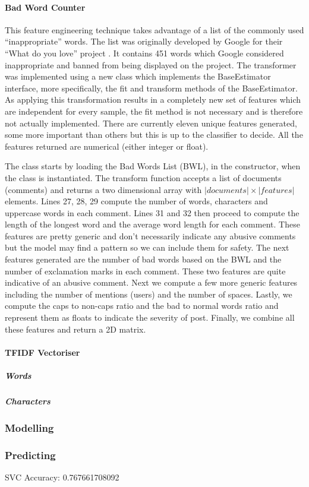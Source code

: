 \paragraph{Bad Word Counter} This feature engineering technique takes advantage of a list of the commonly used ``inappropriate'' words. The list was originally developed by Google for their ``What do you love'' project \cite{GitHub:GoogleBadWordList}. It contains 451 words which Google considered inappropriate and banned from being displayed on the project. The transformer was implemented using a new class which implements the BaseEstimator interface, more specifically, the fit and transform methods of the BaseEstimator. As applying this transformation results in a completely new set of features which are independent for every sample, the fit method is not necessary and is therefore not actually implemented. There are currently eleven unique features generated, some more important than others but this is up to the classifier to decide. All the features returned are numerical (either integer or float).

The class starts by loading the Bad Words List (BWL), in the constructor, when the class is instantiated. The transform function accepts a list of documents (comments) and returns a two dimensional array with $|documents| \times |features|$ elements. Lines 27, 28, 29 compute the number of words, characters and uppercase words in each comment. Lines 31 and 32 then proceed to compute the length of the longest word and the average word length for each comment. These features are pretty generic and don't necessarily indicate any abusive comments but the model may find a pattern so we can include them for safety. The next features generated are the number of bad words based on the BWL and the number of exclamation marks in each comment. These two features are quite indicative of an abusive comment. Next we compute a few more generic features including the number of mentions (users) and the number of spaces. Lastly, we compute the caps to non-caps ratio and the bad to normal words ratio and represent them as floats to indicate the severity of post. Finally, we combine all these features and return a 2D matrix.

\paragraph{TFIDF Vectoriser}

\subparagraph{Words}
\subparagraph{Characters}

\subsubsection{Modelling}

\subsubsection{Predicting}

SVC Accuracy: 0.767661708092

